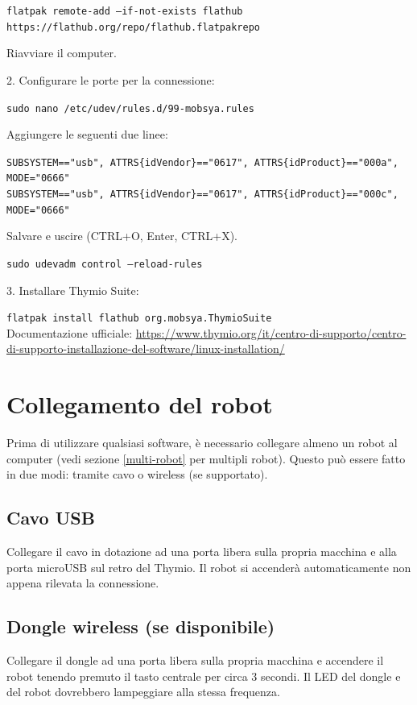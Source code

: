 \documentclass[12pt]{article}
\begin{document}
		\texttt{flatpak remote-add --if-not-exists flathub https://flathub.org/repo/flathub.flatpakrepo}
		
		Riavviare il computer.
		
		2. Configurare le porte per la connessione:
		
		\texttt{sudo nano /etc/udev/rules.d/99-mobsya.rules}
		
		Aggiungere le seguenti due linee:
		
		\texttt{SUBSYSTEM=="usb", ATTRS\{idVendor\}=="0617", ATTRS\{idProduct\}=="000a", MODE="0666"}\\
		\texttt{SUBSYSTEM=="usb", ATTRS\{idVendor\}=="0617", ATTRS\{idProduct\}=="000c", MODE="0666"}
		
		Salvare e uscire (CTRL+O, Enter,  CTRL+X).

		\texttt{sudo udevadm control --reload-rules}
		
		
		3. Installare Thymio Suite:
		
		\texttt{flatpak install flathub org.mobsya.ThymioSuite}\\
		
	
		Documentazione ufficiale: \url{https://www.thymio.org/it/centro-di-supporto/centro-di-supporto-installazione-del-software/linux-installation/}
			

\section{Collegamento del robot}

	Prima di utilizzare qualsiasi software, è necessario collegare almeno un robot al computer (vedi sezione \ref{multi-robot} per multipli robot). Questo può essere fatto in due modi: tramite cavo o wireless (se supportato).
	
	\subsection{Cavo USB}
	
		Collegare il cavo in dotazione ad una porta libera sulla propria macchina e alla porta microUSB sul retro del Thymio. Il robot si accenderà automaticamente non appena rilevata la connessione.
		
	\subsection{Dongle wireless (se disponibile)}
	
		Collegare il dongle ad una porta libera sulla propria macchina e accendere il robot tenendo premuto il tasto centrale per circa 3 secondi. Il LED del dongle e del robot dovrebbero lampeggiare alla stessa frequenza.
	
\end{document}
